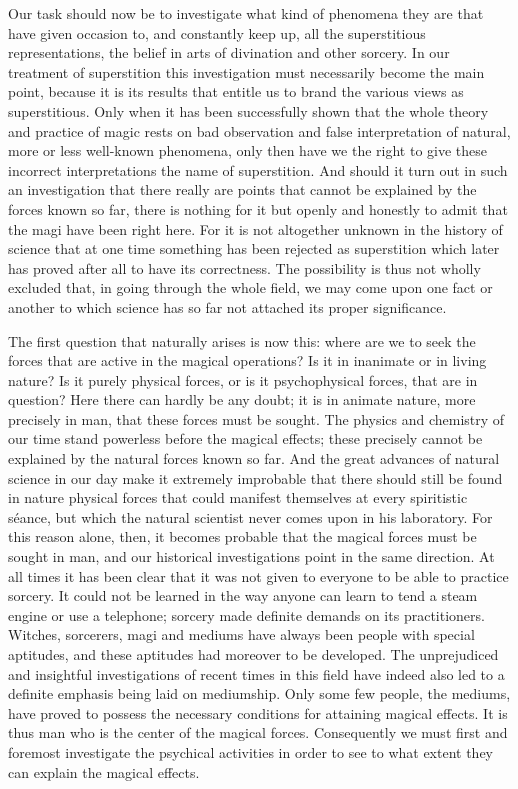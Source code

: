 \documentclass[12pt,a4paper,openany]{book}
\newcommand{\opage}[1]{\marginnote{\footnotesize\textit{[#1]}}}
\begin{document}
Our task should now be to investigate what kind of
phenomena they are that have given occasion to, and constantly
keep up, all the superstitious representations, the belief in
arts of divination and other sorcery. In our treatment of
superstition this investigation must necessarily become the main point,
because it is its results that entitle us to
brand the various views as superstitious. Only when
it has been successfully shown that the whole theory and practice of magic
rests on bad observation and false interpretation of natural,
more or less well-known phenomena, only then have we the right
to give these incorrect interpretations the name of superstition. And
should it turn out in such an investigation that there really
are points that cannot be explained by the forces known
\setcounter{footnote}{0}%
\opage{286}so far, there is nothing for it but openly and honestly to
admit that the magi have been right here. For it is not altogether
unknown in the history of science that at one time something has been
rejected as superstition which later has proved after all to
have its correctness. The possibility is thus not wholly excluded
that, in going through the whole field, we may come upon
one fact or another to which science has so far not
attached its proper significance.

The first question that naturally arises is now
this: where are we to seek the forces that are active in
the magical operations? Is it in inanimate or in living
nature? Is it purely physical forces, or is it psychophysical
forces, that are in question? Here there can hardly
be any doubt; it is in animate nature, more precisely
in man, that these forces must be sought. The physics and chemistry
of our time stand powerless before the magical
effects; these precisely cannot be explained by the natural forces known
so far. And the great advances of natural science
in our day make it extremely improbable that there should still be found in nature
physical forces that could manifest themselves at
every spiritistic séance, but which the natural scientist never
comes upon in his laboratory. For this reason alone, then,
it becomes probable that the magical forces must be sought in
man, and our historical investigations point in the same
direction. At all times it has been clear
that it was not given to everyone to be able to practice sorcery. It
could not be learned in the way anyone can learn to tend a
steam engine or use a telephone; sorcery made
definite demands on its practitioners. Witches, sorcerers,
magi and mediums have always been people with special
aptitudes, and these aptitudes had moreover to be developed. The unprejudiced
and insightful investigations of recent times in this
field have indeed also led to a definite
emphasis being laid on mediumship. Only some few people, the mediums,
have proved to possess the necessary conditions for
\setcounter{footnote}{0}%
\opage{287}attaining magical effects. It is thus man who
is the center of the magical forces. Consequently we must first and
foremost investigate the psychical activities in order to see to
what extent they can explain the magical effects.
\end{document}
